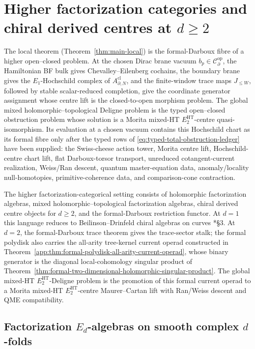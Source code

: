 \section{Higher factorization categories and chiral derived centres at \texorpdfstring{$d\geq 2$}{d>=2}}\label{app:higher-factorization-categories}

The local theorem (Theorem~\ref{thm:main-local}) is the
formal-Darboux fibre of a higher open--closed problem.  At the chosen
Dirac brane vacuum \(b_p\in\mathcal{C}^{\mathrm{op}}_\partial\), the
Hamiltonian BF bulk gives Chevalley--Eilenberg cochains, the boundary
brane gives the \(E_1\)-Hochschild complex of
\(A^{\mathrm{cl}}_{\partial,N}\), and the finite-window trace maps
\(J_{\leq W}\), followed by stable scalar-reduced completion, give the coordinate
generator assignment whose centre lift is the closed-to-open morphism
problem.  The global mixed holomorphic--topological Deligne problem is
the typed open--closed obstruction problem whose solution is a
Morita mixed-HT \(E_2^{\mathrm{HT}}\)-centre quasi-isomorphism.  Its
evaluation at a chosen vacuum contains this Hochschild chart as its
formal fibre only after the typed rows of
\eqref{eq:typed-total-obstruction-ledger} have been supplied: the
Swiss-cheese action tower, Morita centre lift, Hochschild-centre chart
lift, flat Darboux-torsor transport, unreduced cotangent-current
realization, Weiss/Ran descent, quantum master-equation data,
anomaly/locality null-homotopies, primitive-coherence data, and
comparison-cone contraction.

The higher factorization-categorical setting consists of holomorphic
factorization algebras, mixed holomorphic--topological factorization
algebras, chiral derived centre objects for \(d\geq2\), and the
formal-Darboux restriction functor.  At \(d=1\) this language reduces
to Beilinson--Drinfeld chiral algebras on curves
\cite{beilinson-drinfeld-chiral}*{\S 3}.  At \(d=2\), the formal-Darboux
trace theorem gives the trace-sector stalk; the formal polydisk also
carries the all-arity tree-kernel current operad constructed in
Theorem~\ref{app:thm:formal-polydisk-all-arity-current-operad}, whose
binary generator is the diagonal local-cohomology singular product of
Theorem~\ref{thm:formal-two-dimensional-holomorphic-singular-product}.
The global mixed-HT \(E_2^{\mathrm{HT}}\)-Deligne problem is the
promotion of this formal current operad to a Morita mixed-HT
\(E_2^{\mathrm{HT}}\)-centre Maurer--Cartan lift with Ran/Weiss descent
and QME compatibility.

\subsection{\texorpdfstring{Factorization $E_d$-algebras on smooth complex $d$-folds}{Factorization Ed-algebras on smooth complex d-folds}}\label{app:hfc:fact-Ed}

